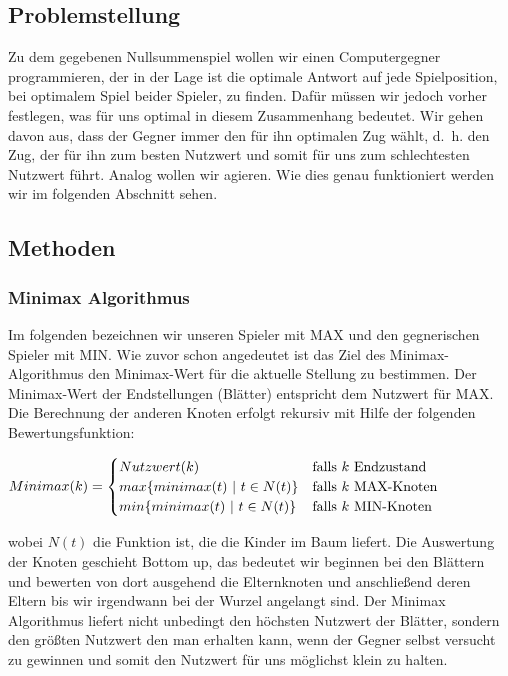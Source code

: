 \subsection{Problemstellung}
Zu dem gegebenen Nullsummenspiel wollen wir einen Computergegner programmieren, der in der Lage ist die optimale Antwort auf jede Spielposition, bei optimalem Spiel beider Spieler, zu finden.
Dafür müssen wir jedoch vorher festlegen, was für uns optimal in diesem Zusammenhang bedeutet. Wir gehen davon aus, dass der Gegner immer den für ihn optimalen Zug wählt, d.~h. den Zug, der für ihn zum besten Nutzwert und somit für uns zum schlechtesten Nutzwert führt. Analog wollen wir agieren. Wie dies genau funktioniert werden wir im folgenden Abschnitt sehen.



\subsection{Methoden}


\subsubsection*{Minimax Algorithmus}
Im folgenden bezeichnen wir unseren Spieler mit MAX und den gegnerischen Spieler mit MIN. Wie zuvor schon angedeutet ist das Ziel des Minimax-Algorithmus den Minimax-Wert für die aktuelle Stellung zu bestimmen. Der Minimax-Wert der Endstellungen (Blätter) entspricht dem Nutzwert für MAX. Die Berechnung der anderen Knoten erfolgt rekursiv mit Hilfe der folgenden Bewertungsfunktion:

\begin{center}
	$Minimax(k) = \begin{cases} Nutzwert(k) & \mathrm{falls}~k~\mathrm{Endzustand}\\
		max\{minimax(t) ~|~ t \in N(t)\} 	& \mathrm{falls}~k~\mathrm{MAX\hbox{-}Knoten}\\
		min\{minimax(t) ~|~ t \in N(t)\}	& \mathrm{falls}~k~\mathrm{MIN\hbox{-}Knoten}	\end{cases} $
\end{center}

wobei $N(t)$ die Funktion ist, die die Kinder im Baum liefert. Die Auswertung der Knoten geschieht Bottom up, das bedeutet wir beginnen bei den Blättern und bewerten von dort ausgehend die Elternknoten und anschließend deren Eltern bis wir irgendwann bei der Wurzel angelangt sind. Der Minimax Algorithmus liefert nicht unbedingt den höchsten Nutzwert der Blätter, sondern den größten Nutzwert den man erhalten kann, wenn der Gegner selbst versucht zu gewinnen und somit den Nutzwert für uns möglichst klein zu halten.\\

